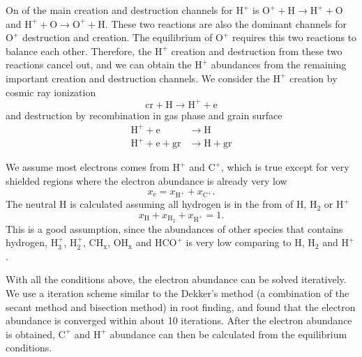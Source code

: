 \documentclass[iop,numberedappendix]{emulateapj}
\newcommand{\e}{\mathrm{e}}
\newcommand{\mr}{\mathrm}
\newcommand{\Ht}{\mathrm{H_2}}
\newcommand{\Ho}{\mathrm{H}}
\newcommand{\Hplus}{\mathrm{H^+}}
\newcommand{\Cplus}{\mathrm{C^+}}
\newcommand{\CHx}{\mathrm{CH_x}}
\newcommand{\OHx}{\mathrm{OH_x}}
\newcommand{\Oplus}{\mathrm{O^+}}
\begin{document}
On of the main creation and destruction channels for $\Hplus$ is 
$\mr{O^+ + H \rightarrow H^+ + O}$ and $\mr{H^+ + O \rightarrow O^+ + H}$. 
These two reactions are also the dominant channels for $\Oplus$ destruction and
creation. The equilibrium of $\Oplus$ requires this two reactions to balance
each other. Therefore, the $\Hplus$ creation and destruction from these two
reactions cancel out, and we can obtain the $\Hplus$ abundances from the
remaining important creation and destruction channels. We consider the $\Hplus$
creation by cosmic ray ionization
\begin{equation*}
    \mr{cr + H\rightarrow H^+ + e}
\end{equation*}
and destruction by recombination in gas phase and grain surface
\begin{align*}
    \mr{H^+ + e}&\mr{\rightarrow H}\\
    \mr{H^+ + e + gr}&\mr{\rightarrow H + gr}
\end{align*}

We assume most electrons comes from $\Hplus$ and $\Cplus$, which is true except
for very shielded regions where the electron abundance is already very low
\begin{equation*}
    x_\e = x_\Hplus + x_\Cplus.
\end{equation*}
The neutral $\Ho$ is calculated assuming all hydrogen is in the from of $\Ho$,
$\Ht$ or $\Hplus$
\begin{equation*}
    x_\Ho + x_\Ht + x_\Hplus = 1.
\end{equation*}
This is a good assumption, since the abundances of other species that contains
hydrogen, $\mr{H_3^+}$, $\mr{H_2^+}$, $\CHx$, $\OHx$ and $\mr{HCO^+}$ is very
low comparing to $\Ho$, $\Ht$ and $\Hplus$.

With all the conditions above, the electron abundance can be solved
iteratively. We use a iteration scheme similar to the Dekker's method
(a combination of the secant method and bisection method) in root finding, 
and found that the electron abundance
is converged within about 10 iterations. After the electron abundance is
obtained, $\Cplus$ and $\Hplus$ abundance can then be calculated from the
equilibrium conditions.
\end{document}
